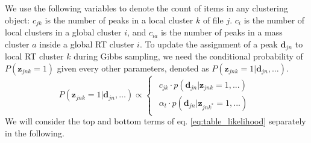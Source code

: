 We use the following variables to denote the count of items in any clustering object: $c_{jk}$ is the number of peaks in a local cluster $k$ of file $j$. $c_{i}$ is the number of local clusters in a global cluster $i$, and $c_{ia}$ is the number of peaks in a mass cluster $a$ inside a global RT cluster $i$. To update the assignment of a peak $\mathbf{d}_{jn}$ to local RT cluster $k$ during Gibbs sampling, we need the conditional probability of $P(\boldsymbol{z}_{jnk}=1)$ given every other parameters, denoted as $P(\boldsymbol{z}_{jnk}=1|\mathbf{d}_{jn},\ldots)$.
\begin{dmath}
P(\boldsymbol{z}_{jnk}=1|\mathbf{d}_{jn},\ldots)\propto\begin{cases}
\begin{array}{c}
c_{jk}\cdot p(\mathbf{d}_{jn}|\boldsymbol{z}_{jnk}=1,...)\\
\alpha_{t}\cdot p(\mathbf{d}_{jn}|\boldsymbol{z}_{jnk^{*}}=1,...)
\end{array}\end{cases}\label{eq:table_likelihood}
\end{dmath}
We will consider the top and bottom terms of eq. \ref{eq:table_likelihood} separately in the following.
